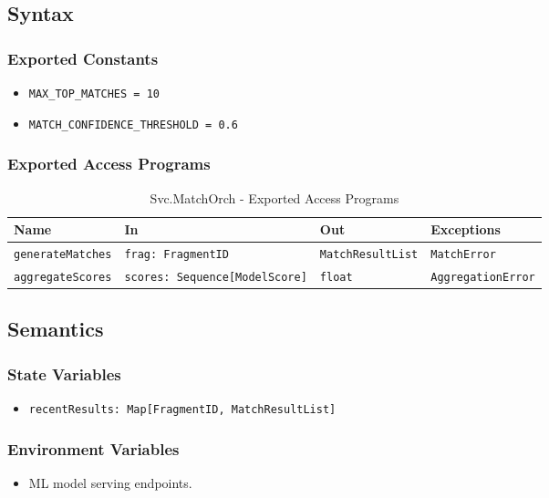 \documentclass[12pt, titlepage]{article}
\begin{document}
\subsection{Syntax}

\subsubsection{Exported Constants}
\begin{itemize}
    \item \texttt{MAX\_TOP\_MATCHES = 10}
    \item \texttt{MATCH\_CONFIDENCE\_THRESHOLD = 0.6}
\end{itemize}

\subsubsection{Exported Access Programs}

\begin{table}[H]
\centering
\small
\caption{Svc.MatchOrch - Exported Access Programs}
\begin{tabular}{p{3.5cm} p{4.5cm} p{2.5cm} p{3.5cm}}
\toprule
\textbf{Name} & \textbf{In} & \textbf{Out} & \textbf{Exceptions} \\
\midrule
\texttt{generateMatches} & \texttt{frag: FragmentID} & \texttt{MatchResultList} & \texttt{MatchError} \\
\texttt{aggregateScores} & \texttt{scores: Sequence[ModelScore]} & \texttt{float} & \texttt{AggregationError} \\
\bottomrule
\end{tabular}
\end{table}

\subsection{Semantics}

\subsubsection{State Variables}
\begin{itemize}
    \item \texttt{recentResults: Map[FragmentID, MatchResultList]}
\end{itemize}

\subsubsection{Environment Variables}
\begin{itemize}
    \item ML model serving endpoints.
\end{itemize}
\end{document}

